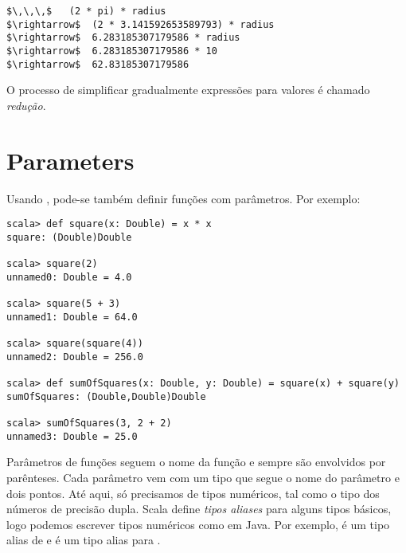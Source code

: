 \begin{lstlisting}
$\,\,\,$   (2 * pi) * radius
$\rightarrow$  (2 * 3.141592653589793) * radius
$\rightarrow$  6.283185307179586 * radius
$\rightarrow$  6.283185307179586 * 10
$\rightarrow$  62.83185307179586
\end{lstlisting}
O processo de simplificar gradualmente express\~{o}es para valores \'{e} 
chamado {\em redu\c{c}\~{a}o}.


\section{Parameters}

Usando , pode-se tamb\'{e}m definir fun\c{c}\~{o}es com par\^{a}metros. Por exemplo:
\begin{lstlisting}
scala> def square(x: Double) = x * x
square: (Double)Double

scala> square(2)
unnamed0: Double = 4.0

scala> square(5 + 3)
unnamed1: Double = 64.0

scala> square(square(4))
unnamed2: Double = 256.0

scala> def sumOfSquares(x: Double, y: Double) = square(x) + square(y)
sumOfSquares: (Double,Double)Double

scala> sumOfSquares(3, 2 + 2)
unnamed3: Double = 25.0
\end{lstlisting}

Par\^{a}metros de fun\c{c}\~{o}es seguem o nome da fun\c{c}\~{a}o e sempre s\~{a}o envolvidos por
par\^{e}nteses. Cada par\^{a}metro vem com um tipo que segue o nome do par\^{a}metro
e dois pontos. At\'{e} aqui, s\'{o} precisamos de tipos num\'{e}ricos, tal como o tipo
 dos n\'{u}meros de precis\~{a}o dupla. Scala define {\em tipos
aliases} para alguns tipos b\'{a}sicos, logo podemos escrever tipos num\'{e}ricos 
como em Java. Por exemplo,  \'{e} um tipo alias de 
e  \'{e} um tipo alias para .       

